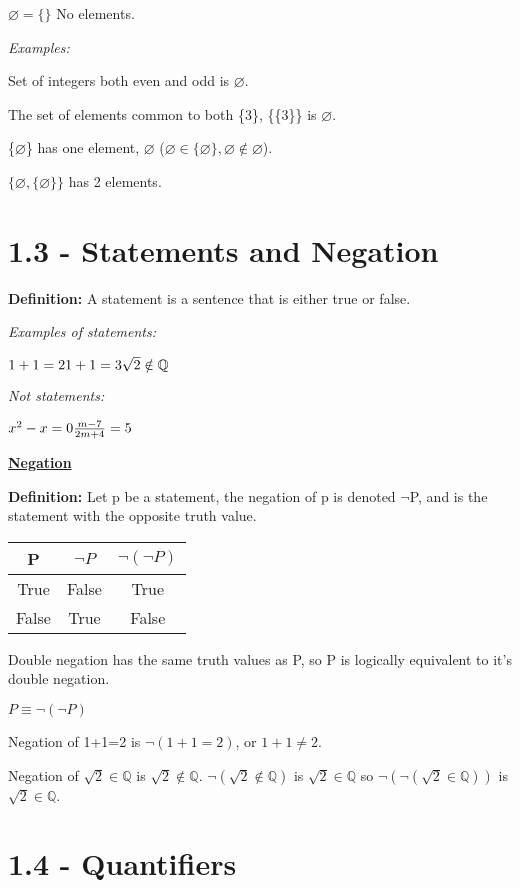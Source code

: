 \documentclass[11pt]{article}
\begin{document}
    $\varnothing = \{\}$ No elements.
    \medskip

    \textit{Examples:}

    Set of integers both even and odd is $\varnothing$.

    The set of elements common to both \{3\}, \{\{3\}\} is $\varnothing$.

    \{$\varnothing$\} has one element, $\varnothing$ ($\varnothing \in \{\varnothing\}, \varnothing \notin \varnothing$).

    $\{\varnothing, \{\varnothing\}\}$ has 2 elements.

\section*{1.3 - Statements and Negation}

    \textbf{Definition: } A statement is a sentence that is either true or false.

    \textit{Examples of statements: }
    
    $1+1=2\\1+1=3\\\sqrt{2} \notin \mathbb{Q}$
    \medskip

    \textit{Not statements:}

    $x^2-x=0\\\frac{m-7}{2m+4}=5$
    \bigskip

    \underline{\textbf{Negation}}

    \textbf{Definition: }Let p be a statement, the negation of p is denoted $\neg$P, and is the statement with the opposite truth value.

    \begin{center}
        \begin{tabular}{ |c|c|c| } 
            \hline
            P & $\neg P$ & $\neg(\neg P)$ \\ 
            \hline
            True & False & True \\ 
            False & True & False \\ 
            \hline
        \end{tabular}
    \end{center}
    
    Double negation has the same truth values as P, so P is logically equivalent to it's double negation.
    
    \begin{center}
        \underline{$P\equiv\neg (\neg P)$}
    \end{center}
    \medskip

    Negation of 1+1=2 is $\neg(1+1=2)$, or $1+1\neq2$.

    Negation of $\sqrt{2} \in \mathbb{Q}$ is $\sqrt{2} \notin \mathbb{Q}$. $\neg(\sqrt{2} \notin \mathbb{Q})$ is $\sqrt{2} \in \mathbb{Q}$ so $\neg(\neg(\sqrt{2} \in \mathbb{Q}))$ is $\sqrt{2} \in \mathbb{Q}$.

\section*{1.4 - Quantifiers}
\end{document}
